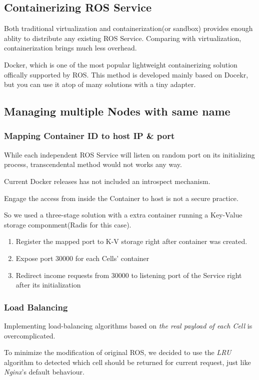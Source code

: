 \subsection{Containerizing ROS Service}
Both traditional virtualization and containerization(or sandbox) provides enough ablity to distribute any existing ROS Service.
Comparing with virtualization, containerization brings much less overhead. %

Docker, which is one of the most popular lightweight containerizing solution offically supported by ROS.
This method is developed mainly based on Docekr, but you can use it atop of many solutions with a tiny adapter. 

\subsection{Managing multiple Nodes with same name}
\subsubsection{Mapping Container ID to host IP \& port}
While each independent ROS Service will listen on random port on its initializing process,
transcendental method would not works any way. 

Current Docker releases has not included an introspect mechanism.

Engage the access from inside the Container to host is not a secure practice.

So we used a three-stage solution with a extra container running a Key-Value storage componment(Radis for this case).
\begin{enumerate}
    \item Register the mapped port to K-V storage right after container was created.
    \item Expose port 30000 for each Cells' container
    \item Redirect income requests from 30000 to listening port of the Service right after its initialization
\end{enumerate}

\subsubsection{Load Balancing}
Implementing load-balancing algorithms based on \emph{the real payload of each Cell} is overcomplicated.

To minimize the modification of original ROS, we decided to use the \emph{LRU} algorithm to detected which cell should be returned for current request, just like \emph{Nginx}'s default behaviour.

